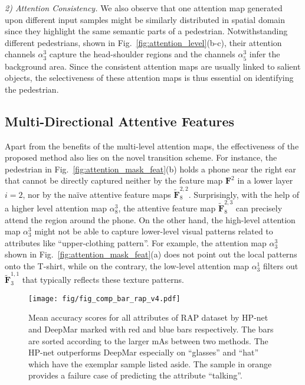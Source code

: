 \documentclass[10pt,twocolumn,letterpaper]{article}
\begin{document}
\textit{2) Attention Consistency.}
We also observe that one attention map generated upon different input samples might be similarly distributed in spatial domain since they highlight the same semantic parts of a pedestrian.
Notwithstanding different pedestrians, shown in Fig.~\ref{fig:attention_level}(b-c), their attention channels $\alpha_3^3$ capture the head-shoulder regions and the channels $\alpha^3_5$ infer the background area.
Since the consistent attention maps are usually linked to salient objects, the selectiveness of these attention maps is thus essential on identifying the pedestrian.


\subsection{Multi-Directional Attentive Features}
\label{subsec:multi_directional_attentive_features}

Apart from the benefits of the multi-level attention maps, the effectiveness of the proposed method also lies on the novel transition scheme.
For instance, the pedestrian in Fig.~\ref{fig:attention_mask_feat}(b) holds a phone near the right ear that cannot be directly captured neither by the feature map $\mathbf{F}^2$ in a lower layer $i=2$, nor by the na\"ive attentive feature maps $\tilde{\mathbf{F}}^{2,2}_8$.
Surprisingly, with the help of a higher level attention map $\alpha^3_8$, the attentive feature map $\tilde{\mathbf{F}}^{2,3}_8$ can precisely attend the region around the phone.
On the other hand, the high-level attention map $\alpha^3_3$ might not be able to capture lower-level visual patterns related to attributes like ``upper-clothing pattern''.
For example, the attention map $\alpha^3_3$ shown in Fig.~\ref{fig:attention_mask_feat}(a) does not point out the local patterns onto the T-shirt, while on the contrary, the low-level attention map $\alpha^1_3$ filters out $\tilde{\mathbf{F}}^{1,1}_3$ that typically reflects these texture patterns.




\begin{figure*}[t]
\centering
\texttt{[image: fig/fig\_comp\_bar\_rap\_v4.pdf]}
\caption{
Mean accuracy scores for all attributes of RAP dataset by HP-net and DeepMar marked with red and blue bars respectively. The bars are sorted according to the larger mAs between two methods. The HP-net outperforms DeepMar especially on ``glasses'' and ``hat'' which have the exemplar sample listed aside. The sample in orange provides a failure case of predicting the attribute ``talking''.
}
\label{fig:comp_bar_rap}
\end{figure*}
\end{document}
